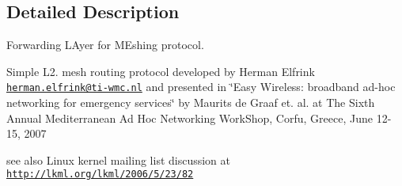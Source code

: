 \subsection{Detailed Description}
Forwarding L\+Ayer for M\+Eshing protocol. 

Simple L2. mesh routing protocol developed by Herman Elfrink \href{mailto:herman.elfrink@ti-wmc.nl}{\tt herman.\+elfrink@ti-\/wmc.\+nl} and presented in \char`\"{}\+Easy Wireless\+: broadband ad-\/hoc networking for emergency services\char`\"{} by Maurits de Graaf et. al. at The Sixth Annual Mediterranean Ad Hoc Networking Work\+Shop, Corfu, Greece, June 12-\/15, 2007

see also Linux kernel mailing list discussion at \href{http://lkml.org/lkml/2006/5/23/82}{\tt http\+://lkml.\+org/lkml/2006/5/23/82} 